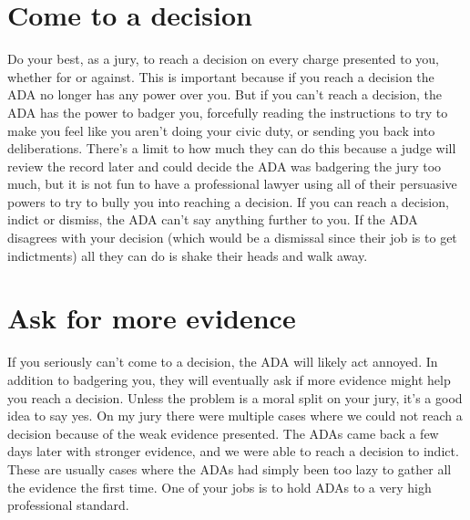 \documentclass[letterpaper]{article}
\begin{document}
\section*{Come to a decision}
Do your best, as a jury, to reach a decision on every charge presented to you, whether for or against.
This is important because if you reach a decision the ADA no longer has any power over you.
But if you can't reach a decision, the ADA has the power to badger you, forcefully reading the instructions to try to make you feel like you aren't doing your civic duty, or sending you back into deliberations. 
There's a limit to how much they can do this because a judge will review the record later and could decide the ADA was badgering the jury too much, but it is not fun to have a professional lawyer using all of their persuasive powers to try to bully you into reaching a decision. 
If you can reach a decision, indict or dismiss, the ADA can't say anything further to you. 
If the ADA disagrees with your decision (which would be a dismissal since their job is to get indictments) all they can do is shake their heads and walk away.

\section*{Ask for more evidence}
If you seriously can't come to a decision, the ADA will likely act annoyed.
In addition to badgering you, they will eventually ask if more evidence might help you reach a decision.
Unless the problem is a moral split on your jury, it's a good idea to say yes.
On my jury there were multiple cases where we could not reach a decision because of the weak evidence presented.
The ADAs came back a few days later with stronger evidence, and we were able to reach a decision to indict.
These are usually cases where the ADAs had simply been too lazy to gather all the evidence the first time.
One of your jobs is to hold ADAs to a very high professional standard.




 
\end{document}
